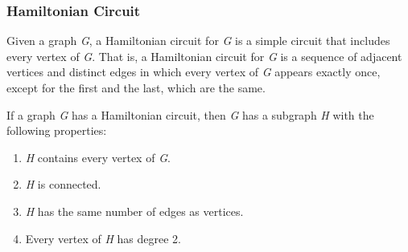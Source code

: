\documentclass{article}
\begin{document}
\subsubsection{Hamiltonian Circuit}
Given a graph \textit{G}, a Hamiltonian circuit for \textit{G} is a simple circuit that includes every vertex of \textit{G}. That is, a Hamiltonian circuit for \textit{G} is a sequence of adjacent vertices and distinct edges in which every vertex of \textit{G} appears exactly once, except for the first and the last, which are the same.

If a graph \textit{G} has a Hamiltonian circuit, then \textit{G} has a subgraph \textit{H} with the following properties:

\begin{enumerate}
\item \textit{H} contains every vertex of \textit{G}.
\item \textit{H} is connected.
\item \textit{H} has the same number of edges as vertices.
\item Every vertex of \textit{H} has degree 2.
\end{enumerate}
\end{document}

